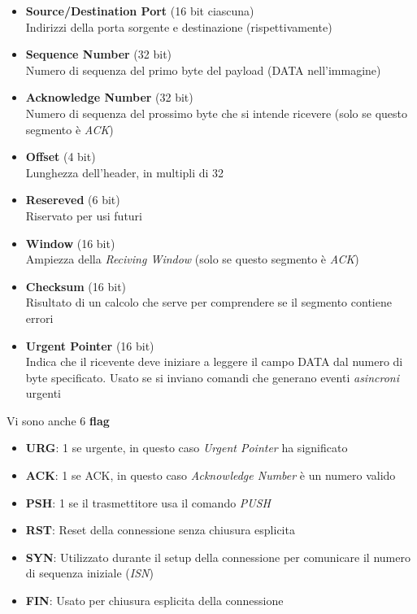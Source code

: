 \documentclass{article}
\begin{document}
                \begin{itemize}
                    \item \textbf{Source/Destination Port} (16 bit ciascuna)\\ 
                          Indirizzi della porta sorgente e destinazione (rispettivamente)
                    \item \textbf{Sequence Number} (32 bit)\\
                          Numero di sequenza del primo byte del payload (DATA nell'immagine)
                    \item \textbf{Acknowledge Number} (32 bit)\\
                          Numero di sequenza del prossimo byte che si intende ricevere (solo se questo segmento è \textit{ACK})
                    \item \textbf{Offset} (4 bit)\\
                          Lunghezza dell'header, in multipli di 32
                    \item \textbf{Resereved} (6 bit)\\
                          Riservato per usi futuri
                    \item \textbf{Window} (16 bit)\\
                          Ampiezza della \textit{Reciving Window} (solo se questo segmento è \textit{ACK})
                    \item \textbf{Checksum} (16 bit)\\
                          Risultato di un calcolo che serve per comprendere se il segmento contiene errori
                    \item \textbf{Urgent Pointer} (16 bit)\\
                          Indica che il ricevente deve iniziare a leggere il campo DATA dal numero di byte specificato. Usato se si inviano comandi che generano eventi \textit{asincroni} urgenti
                \end{itemize}
                Vi sono anche 6 \textbf{flag}
                \begin{itemize}
                    \item \textbf{URG}: 1 se urgente, in questo caso \textit{Urgent Pointer} ha significato
                    \item \textbf{ACK}: 1 se ACK, in questo caso \textit{Acknowledge Number} è un numero valido
                    \item \textbf{PSH}: 1 se il trasmettitore usa il comando \textit{PUSH}
                    \item \textbf{RST}: Reset della connessione senza chiusura esplicita
                    \item \textbf{SYN}: Utilizzato durante il setup della connessione per comunicare il numero di sequenza iniziale (\textit{ISN})
                    \item \textbf{FIN}: Usato per chiusura esplicita della connessione
                \end{itemize}
                
\end{document}
